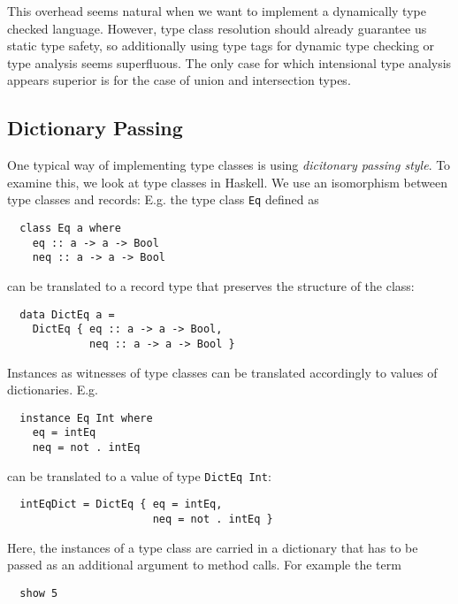 This overhead seems natural when we want to implement a dynamically type checked language.
However, type class resolution should already guarantee us static type safety, so additionally using type tags for dynamic type checking or type analysis seems superfluous.
The only case for which intensional type analysis appears superior is for the case of union and intersection types.


\subsection{Dictionary Passing}
\label{sec:dictionaryPassing}

One typical way of implementing type classes is using \emph{dicitonary passing style}.
To examine this, we look at type classes in Haskell.
We use an isomorphism between type classes and records:
E.g. the type class \texttt{Eq} defined as

\begin{verbatim}
  class Eq a where
    eq :: a -> a -> Bool
    neq :: a -> a -> Bool
\end{verbatim}

can be translated to a record type that preserves the structure of the class:

\begin{verbatim}
  data DictEq a =
    DictEq { eq :: a -> a -> Bool,
             neq :: a -> a -> Bool }
\end{verbatim}

Instances as witnesses of type classes can be translated accordingly to values of dictionaries.
E.g.

\begin{verbatim}
  instance Eq Int where
    eq = intEq
    neq = not . intEq  
\end{verbatim}

can be translated to a value of type \texttt{DictEq Int}:

\begin{verbatim}
  intEqDict = DictEq { eq = intEq,
                       neq = not . intEq }
\end{verbatim}

Here, the instances of a type class are carried in a dictionary that has to be passed as an additional argument to method calls.
For example the term

\begin{verbatim}
  show 5
\end{verbatim}

